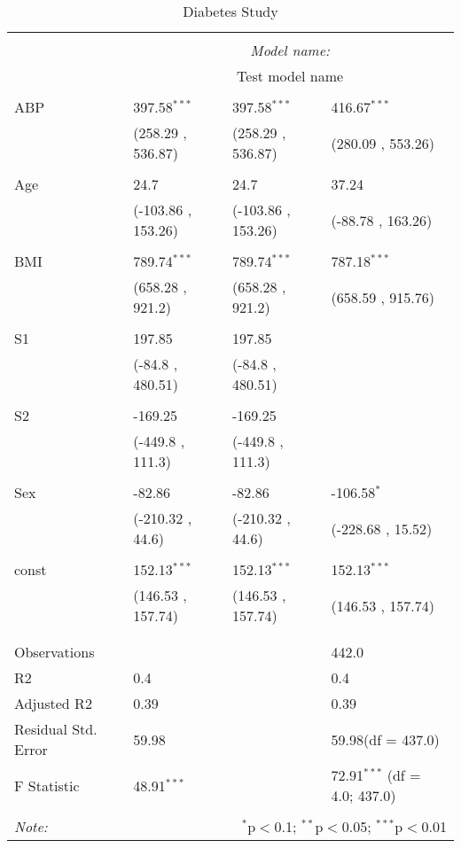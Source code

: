 \begin{table}[!htbp] \centering
  \caption{Diabetes Study}
  \label{}
\begin{tabularx}{\textwidth}{lXXX}
\\[-1.8ex]\hline
\hline \\[-1.8ex]
& \multicolumn{3}{c}{\textit{Model name:}} \
\cr \cline{3-4}
\\[-1.8ex] & \multicolumn{3}{c}{Test model name} \\\hline \\[-1.8ex]
 ABP & 397.58$^{***}$ & 397.58$^{***}$ & 416.67$^{***}$ \\
  & (258.29 , 536.87) & (258.29 , 536.87) & (280.09 , 553.26) \\
  & & & \\
 Age & 24.7$^{}$ & 24.7$^{}$ & 37.24$^{}$ \\
  & (-103.86 , 153.26) & (-103.86 , 153.26) & (-88.78 , 163.26) \\
  & & & \\
 BMI & 789.74$^{***}$ & 789.74$^{***}$ & 787.18$^{***}$ \\
  & (658.28 , 921.2) & (658.28 , 921.2) & (658.59 , 915.76) \\
  & & & \\
 S1 & 197.85$^{}$ & 197.85$^{}$ & \\
  & (-84.8 , 480.51) & (-84.8 , 480.51) & \\
  & & & \\
 S2 & -169.25$^{}$ & -169.25$^{}$ & \\
  & (-449.8 , 111.3) & (-449.8 , 111.3) & \\
  & & & \\
 Sex & -82.86$^{}$ & -82.86$^{}$ & -106.58$^{*}$ \\
  & (-210.32 , 44.6) & (-210.32 , 44.6) & (-228.68 , 15.52) \\
  & & & \\
 const & 152.13$^{***}$ & 152.13$^{***}$ & 152.13$^{***}$ \\
  & (146.53 , 157.74) & (146.53 , 157.74) & (146.53 , 157.74) \\
  & & & \\
\hline \\[-1.8ex]
 Observations &   &   & 442.0 \\
 R${2}$ & 0.4 &   & 0.4 \\
 Adjusted R${2}$ & 0.39 &   & 0.39 \\
 Residual Std. Error & 59.98 &   & 59.98(df = 437.0)  \\
 F Statistic & 48.91$^{***}$  &     & 72.91$^{***}$ (df = 4.0; 437.0) \\
\hline
\hline \\[-1.8ex]
\textit{Note:} & \multicolumn{3}{r}{$^{*}$p$<$0.1; $^{**}$p$<$0.05; $^{***}$p$<$0.01} \\
\end{tabularx}
\end{table}